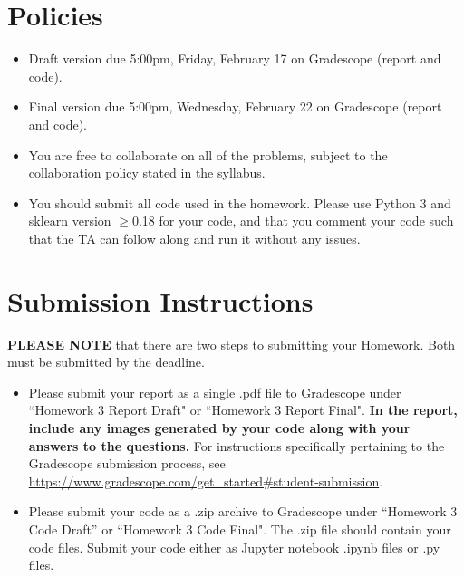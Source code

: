 \newif\ifshowsolutions
\showsolutionsfalse




\pagestyle{fancy}

\section*{Policies}

\begin{itemize}
	\item Draft version due 5:00pm, Friday, February 17 on Gradescope (report and code).
	\item Final version due 5:00pm, Wednesday, February 22 on Gradescope (report and code).
	\item You are free to collaborate on all of the problems, subject to the collaboration policy stated in the syllabus.
	\item You should submit all code used in the homework.
	      Please use Python 3 and sklearn version $\geq$0.18 for your code, and that you comment your code such that the TA can follow along and run it without any issues.
\end{itemize}

\section*{Submission Instructions}
\textbf{PLEASE NOTE} that there are two steps to submitting your Homework.
Both must be submitted by the deadline.

\begin{itemize}
	\item Please submit your report as a single .pdf file to Gradescope under ``Homework 3 Report Draft" or ``Homework 3 Report Final".
	      \textbf{In the report, include any images generated by your code along with your answers to the questions.}
	      For instructions specifically pertaining to the Gradescope submission process, see \url{https://www.gradescope.com/get_started#student-submission}.
	\item Please submit your code as a .zip archive to Gradescope under ``Homework 3 Code Draft'' or ``Homework 3 Code Final".
	      The .zip file should contain your code files.
	      Submit your code either as Jupyter notebook .ipynb files or .py files.
\end{itemize}

